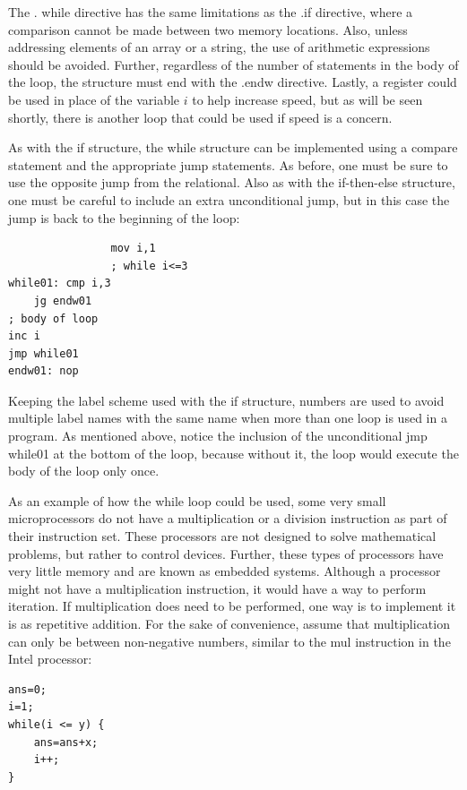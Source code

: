 \documentclass[10pt]{book}
\begin{document}
The . while directive has the same limitations as the .if directive, where a comparison cannot be made between two memory locations. Also, unless addressing elements of an array or a string, the use of arithmetic expressions should be avoided. Further, regardless of the number of statements in the body of the loop, the structure must end with the .endw directive. Lastly, a register could be used in place of the variable $i$ to help increase speed, but as will be seen shortly, there is another loop that could be used if speed is a concern.

As with the if structure, the while structure can be implemented using a compare statement and the appropriate jump statements. As before, one must be sure to use the opposite jump from the relational. Also as with the if-then-else structure, one must be careful to include an extra unconditional jump, but in this case the jump is back to the beginning of the loop:

\begin{verbatim}
                mov i,1
                ; while i<=3
while01: cmp i,3
    jg endw01
; body of loop
inc i
jmp while01
endw01: nop
\end{verbatim}

Keeping the label scheme used with the if structure, numbers are used to avoid multiple label names with the same name when more than one loop is used in a program. As mentioned above, notice the inclusion of the unconditional jmp while01 at the bottom of the loop, because without it, the loop would execute the body of the loop only once.

As an example of how the while loop could be used, some very small microprocessors do not have a multiplication or a division instruction as part of their instruction set. These processors are not designed to solve mathematical problems, but rather to control devices. Further, these types of processors have very little memory and are known as embedded systems. Although a processor might not have a multiplication instruction, it would have a way to perform iteration. If multiplication does need to be performed, one way is to implement it is as repetitive addition. For the sake of convenience, assume that multiplication can only be between non-negative numbers, similar to the mul instruction in the Intel processor:

\begin{verbatim}
ans=0;
i=1;
while(i <= y) {
    ans=ans+x;
    i++;
}
\end{verbatim}
\end{document}
